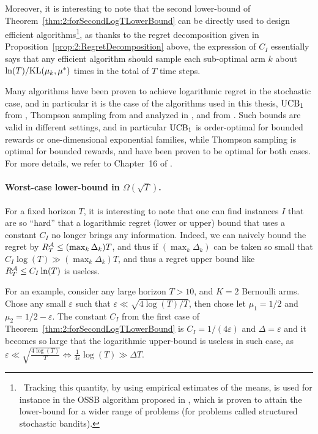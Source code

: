 Moreover, it is interesting to note that the second lower-bound of Theorem~\ref{thm:2:forSecondLogTLowerBound} can be directly used to design efficient algorithms\footnote{~Tracking this quantity, by using empirical estimates of the means, is used for instance in the OSSB algorithm proposed in \cite{Combes17}, which is proven to attain the lower-bound for a wider range of problems (for problems called structured stochastic bandits).}, as thanks to the regret decomposition given in Proposition~\ref{prop:2:RegretDecomposition} above, the expression of $C_I$ essentially says that any efficient algorithm
should sample each sub-optimal arm $k$ about $\ln(T)/\mathrm{KL}(\mu_k,\mu^*)$ times in the total of $T$ time steps.


Many algorithms have been proven to achieve logarithmic regret in the stochastic case,
and in particular it is the case of the algorithms used in this thesis, $\mathrm{UCB}_1$ from \cite{Auer02}, Thompson sampling from \cite{Thompson33} and analyzed in \cite{AgrawalGoyal11,Kaufmann12Thompson}, and \klUCB{} from \cite{Garivier11KL,KLUCBJournal}.
%
Such bounds are valid in different settings, and in particular $\mathrm{UCB}_1$ is order-optimal for bounded rewards or one-dimensional exponential families,
while Thompson sampling is optimal for bounded rewards, and \klUCB{} have been proven to be optimal for both cases.
%
For more details, we refer to Chapter~16 of \cite{LattimoreBanditAlgorithmsBook}.


\paragraph{Worst-case lower-bound in $\Omega(\sqrt{T})$.}
%
For a fixed horizon $T$, it is interesting to note that one can find instances $I$ that are so ``hard'' that a logarithmic regret (lower or upper) bound that uses a constant $C_I$ no longer brings any information.
Indeed, we can naively bound the regret by $R_T^{\mathcal{A}} \leq (\max_k \Delta_k) T$, and thus if $(\max_k \Delta_k)$ can be taken so small that $C_I \log(T) \gg (\max_k \Delta_k) T$, and thus a regret upper bound like $R_T^{\mathcal{A}} \leq C_I \ln(T)$ is useless.
%
\begin{smallproof}\label{proof:2:worstCaseLowerBound}
    For an example, consider any large horizon $T>10$, and $K=2$ Bernoulli arms.
    Chose any small $\varepsilon$ such that $\varepsilon \ll \sqrt{4 \log(T) / T}$, then chose let $\mu_1 = 1/2$ and $\mu_2 = 1/2 - \varepsilon$.
    The constant $C_I$ from the first case of Theorem~\ref{thm:2:forSecondLogTLowerBound} is $C_I = 1 / (4 \varepsilon)$ and $\Delta=\varepsilon$ and it becomes so large that
    the logarithmic upper-bound is useless in such case, as
    $\varepsilon \ll \sqrt{\frac{4 \log(T)}{T}} \Longleftrightarrow \frac{1}{4\varepsilon} \log(T) \gg \Delta T$.
\end{smallproof}

